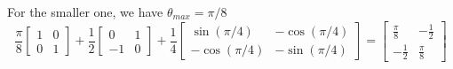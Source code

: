 \documentclass[11pt,english]{article}
\begin{document}
\begin{enumerate}
For the smaller one, we have $\theta_{max} = \pi/8$
\[
\frac{\pi}{8} 
\begin{bmatrix}
    1 & 0 \\
    0 & 1
\end{bmatrix} + \frac{1}{2} 
\begin{bmatrix}
    0 & 1 \\
   -1 & 0
\end{bmatrix} + \frac{1}{4} 
\begin{bmatrix}
    \sin (\pi/4)  & -\cos (\pi/4) \\
    -\cos (\pi/4) & -\sin (\pi/4) 
\end{bmatrix} =  
\begin{bmatrix}
    \frac{\pi}{8} & -\frac{1}{2} \\
    -\frac{1}{2} & \frac{\pi}{8}
\end{bmatrix}  
\]
\end{enumerate}
\end{document}
